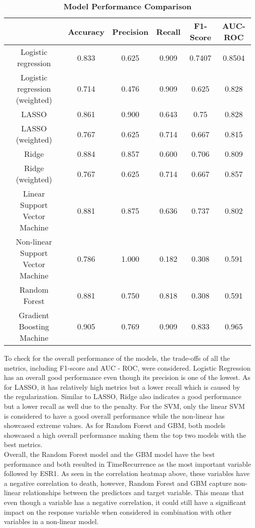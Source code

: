 \documentclass[11pt,singlespace]{article}
\begin{document}
	\begin{center}
			\begin{table}[h]
		\begin{tabular}{|c|c|c|c|c|c|}
			\hline
			& Accuracy & Precision & Recall & F1-Score & AUC-ROC \\
			\hline
			Logistic regression & 0.833 & 0.625 & 0.909 & 0.7407 & 0.8504 \\
			\hline
			Logistic regression (weighted) & 0.714 & 0.476 & 0.909 & 0.625 & 0.828 \\
			\hline
			LASSO & 0.861 & 0.900 & 0.643 & 0.75 & 0.828 \\
			\hline
			LASSO (weighted) & 0.767 & 0.625 & 0.714 & 0.667 & 0.815 \\
			\hline
			Ridge & 0.884 & 0.857 & 0.600 & 0.706 & 0.809 \\
			\hline
			Ridge (weighted) & 0.767 & 0.625 & 0.714 & 0.667 & 0.857 \\
			\hline
			Linear Support Vector Machine & 0.881 & 0.875 & 0.636 & 0.737 & 0.802 \\
			\hline
			Non-linear Support Vector Machine & 0.786 & 1.000 & 0.182 & 0.308 & 0.591 \\
			\hline
			Random Forest & 0.881 & 0.750 & 0.818 & 0.308 & 0.591 \\
			\hline
			Gradient Boosting Machine & 0.905 & 0.769 & 0.909 & 0.833 & 0.965 \\
			\hline
		\end{tabular}
		\caption{\textbf{Model Performance Comparison}}
		\label{tab:results}
		\end{table}
	\end{center}
		
			
		To check for the overall performance of the models, the trade-offs of all the metrics, including F1-score and AUC - ROC, were considered. Logistic Regression has an overall good performance even though its precision is one of the lowest. As for LASSO, it has relatively high metrics but a lower recall which is caused by the regularization. Similar to LASSO, Ridge also indicates a good performance but a lower recall as well due to the penalty. For the SVM, only the linear SVM is considered to have a good overall performance while the non-linear has showcased extreme values. As for Random Forest and GBM, both models showcased a high overall performance making them the top two models with the best metrics.
		\\
		
		Overall, the Random Forest model and the GBM model have the best performance and both resulted in TimeRecurrence as the most important variable followed by ESR1. As seen in the correlation heatmap above, these variables have a negative correlation to death, however, Random Forest and GBM capture non-linear relationships between the predictors and target variable. This means that even though a variable has a negative correlation, it could still have a significant impact on the response variable when considered in combination with other variables in a non-linear model.
		
\end{document}
